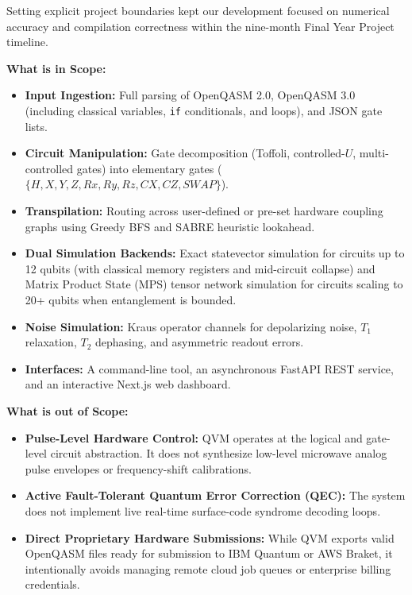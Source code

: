 Setting explicit project boundaries kept our development focused on numerical accuracy and compilation correctness within the nine-month Final Year Project timeline.

\textbf{What is in Scope:}
\begin{itemize}[leftmargin=*]
    \item \textbf{Input Ingestion:} Full parsing of OpenQASM 2.0, OpenQASM 3.0 (including classical variables, \texttt{if} conditionals, and loops), and JSON gate lists.
    \item \textbf{Circuit Manipulation:} Gate decomposition (Toffoli, controlled-$U$, multi-controlled gates) into elementary gates ($\{H, X, Y, Z, Rx, Ry, Rz, CX, CZ, SWAP\}$).
    \item \textbf{Transpilation:} Routing across user-defined or pre-set hardware coupling graphs using Greedy BFS and SABRE heuristic lookahead.
    \item \textbf{Dual Simulation Backends:} Exact statevector simulation for circuits up to 12 qubits (with classical memory registers and mid-circuit collapse) and Matrix Product State (MPS) tensor network simulation for circuits scaling to 20+ qubits when entanglement is bounded.
    \item \textbf{Noise Simulation:} Kraus operator channels for depolarizing noise, $T_1$ relaxation, $T_2$ dephasing, and asymmetric readout errors.
    \item \textbf{Interfaces:} A command-line tool, an asynchronous FastAPI REST service, and an interactive Next.js web dashboard.
\end{itemize}

\textbf{What is out of Scope:}
\begin{itemize}[leftmargin=*]
    \item \textbf{Pulse-Level Hardware Control:} QVM operates at the logical and gate-level circuit abstraction. It does not synthesize low-level microwave analog pulse envelopes or frequency-shift calibrations.
    \item \textbf{Active Fault-Tolerant Quantum Error Correction (QEC):} The system does not implement live real-time surface-code syndrome decoding loops.
    \item \textbf{Direct Proprietary Hardware Submissions:} While QVM exports valid OpenQASM files ready for submission to IBM Quantum or AWS Braket, it intentionally avoids managing remote cloud job queues or enterprise billing credentials.
\end{itemize}

